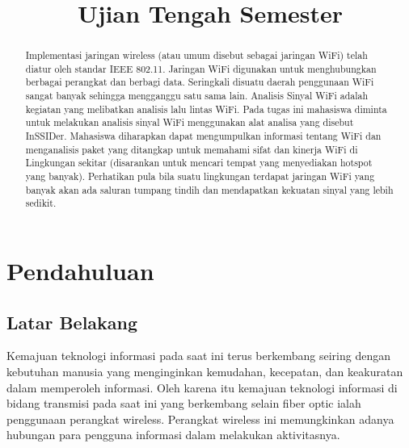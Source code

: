\documentclass[conference]{IEEEtran}
\begin{document}
\title{Ujian Tengah Semester\\

}

\author{


}

\maketitle

\begin{abstract}
Implementasi jaringan wireless (atau umum disebut sebagai jaringan WiFi) telah diatur oleh standar
IEEE 802.11. Jaringan WiFi digunakan untuk menghubungkan berbagai perangkat dan berbagi data.
Seringkali disuatu daerah penggunaan WiFi sangat banyak sehingga mengganggu satu sama lain. Analisis Sinyal WiFi adalah kegiatan yang melibatkan analisis lalu lintas WiFi. Pada tugas ini mahasiswa
diminta untuk melakukan analisis sinyal WiFi menggunakan alat analisa yang disebut InSSIDer. Mahasiswa diharapkan dapat mengumpulkan informasi tentang WiFi dan menganalisis paket yang ditangkap
untuk memahami sifat dan kinerja WiFi di Lingkungan sekitar (disarankan untuk mencari tempat yang
menyediakan hotspot yang banyak). Perhatikan pula bila suatu lingkungan terdapat jaringan WiFi yang
banyak akan ada saluran tumpang tindih dan mendapatkan kekuatan sinyal yang lebih sedikit.
 
\end{abstract}


\section{Pendahuluan}

\subsection{Latar Belakang}
Kemajuan teknologi informasi pada saat ini terus berkembang seiring dengan kebutuhan manusia yang menginginkan kemudahan, kecepatan, dan keakuratan dalam memperoleh informasi. Oleh karena itu kemajuan teknologi informasi di bidang transmisi pada saat ini yang berkembang selain fiber optic ialah penggunaan perangkat wireless. Perangkat wireless ini memungkinkan adanya hubungan para pengguna informasi dalam melakukan aktivitasnya.
\vspace{1pt}
\end{document}

